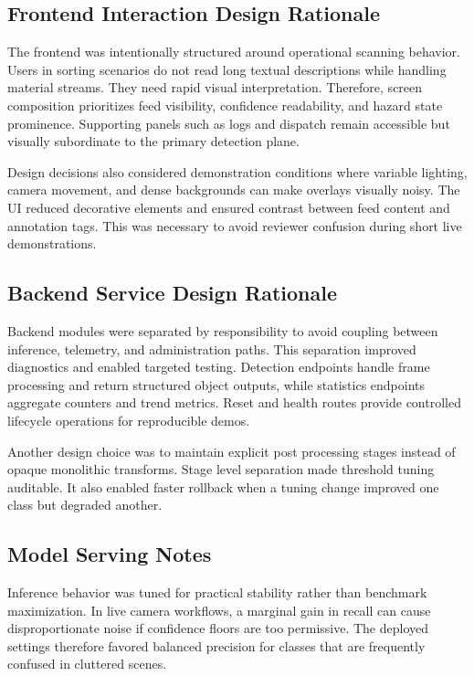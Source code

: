 \documentclass[12pt,a4paper]{report}
\begin{document}
\subsection{Frontend Interaction Design Rationale}
The frontend was intentionally structured around operational scanning behavior. Users in sorting scenarios do not read long textual descriptions while handling material streams. They need rapid visual interpretation. Therefore, screen composition prioritizes feed visibility, confidence readability, and hazard state prominence. Supporting panels such as logs and dispatch remain accessible but visually subordinate to the primary detection plane.

Design decisions also considered demonstration conditions where variable lighting, camera movement, and dense backgrounds can make overlays visually noisy. The UI reduced decorative elements and ensured contrast between feed content and annotation tags. This was necessary to avoid reviewer confusion during short live demonstrations.

\subsection{Backend Service Design Rationale}
Backend modules were separated by responsibility to avoid coupling between inference, telemetry, and administration paths. This separation improved diagnostics and enabled targeted testing. Detection endpoints handle frame processing and return structured object outputs, while statistics endpoints aggregate counters and trend metrics. Reset and health routes provide controlled lifecycle operations for reproducible demos.

Another design choice was to maintain explicit post processing stages instead of opaque monolithic transforms. Stage level separation made threshold tuning auditable. It also enabled faster rollback when a tuning change improved one class but degraded another.

\subsection{Model Serving Notes}
Inference behavior was tuned for practical stability rather than benchmark maximization. In live camera workflows, a marginal gain in recall can cause disproportionate noise if confidence floors are too permissive. The deployed settings therefore favored balanced precision for classes that are frequently confused in cluttered scenes.
\end{document}
